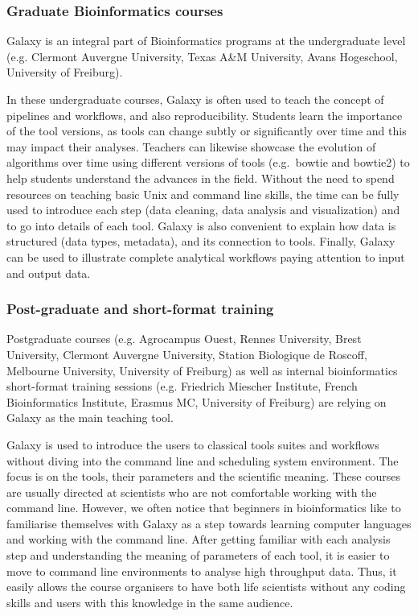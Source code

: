 \documentclass[10pt,letterpaper]{article}
\begin{document}
\subsubsection*{Graduate Bioinformatics courses}

Galaxy is an integral part of Bioinformatics programs at the undergraduate level (e.g. Clermont Auvergne University, Texas A\&M University, Avans Hogeschool, University of Freiburg). 

In these undergraduate courses, Galaxy is often used to teach the concept of pipelines and workflows, and also reproducibility. Students learn the importance of the tool versions, as tools can change subtly or significantly over time and this may impact their analyses. Teachers can likewise showcase the evolution of algorithms over time using different versions of tools (e.g.\ bowtie and bowtie2) to help students understand the advances in the field. 
Without the need to spend resources on teaching basic Unix and command line skills, the time can be fully used to introduce each step (data cleaning, data analysis and visualization) and to go into details of each tool. Galaxy is also convenient to explain how data is structured (data types, metadata), and its connection to tools. Finally, Galaxy can be used to illustrate complete analytical workflows paying attention to input and output data.

\subsubsection*{Post-graduate and short-format training}

Postgraduate courses (e.g. Agrocampus Ouest, Rennes University, Brest University, Clermont Auvergne University, Station Biologique de Roscoff, Melbourne University, University of Freiburg) as well as internal bioinformatics short-format training sessions (e.g. Friedrich Miescher Institute, French Bioinformatics Institute, Erasmus MC, University of Freiburg) are relying on Galaxy as the main teaching tool.

Galaxy is used to introduce the users to classical tools suites and workflows without diving into the command line and scheduling system environment. The focus is on the tools, their parameters and the scientific meaning. These courses are usually directed at scientists who are not comfortable working with the command line. However, we often notice that beginners in bioinformatics like to familiarise themselves with Galaxy as a step towards learning computer languages and working with the command line. After getting familiar with each analysis step and understanding the meaning of parameters of each tool, it is easier to move to command line environments to analyse high throughput data. Thus, it easily allows the course organisers to have both life scientists without any coding skills and users with this knowledge in the same audience.
\end{document}
